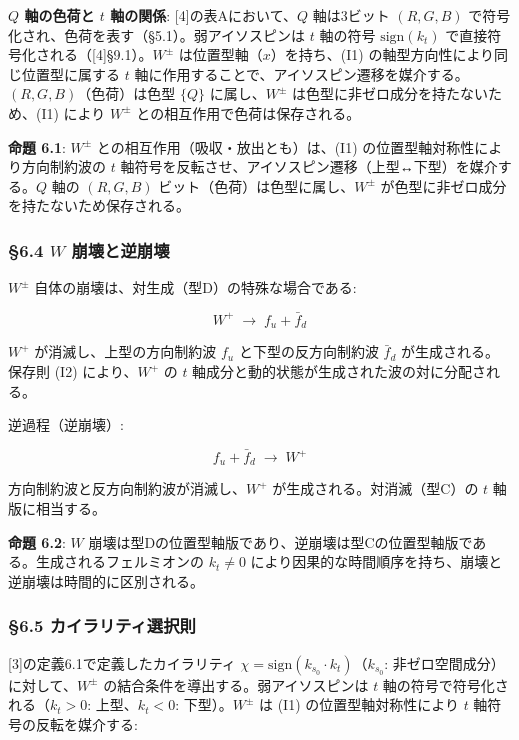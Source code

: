 \documentclass[
  a4paper,11pt]{ltjsarticle}
\theoremstyle{definition}
\theoremstyle{remark}
\begin{document}
\textbf{\(Q\) 軸の色荷と \(t\) 軸の関係}: {[}4{]}の表Aにおいて、\(Q\)
軸は3ビット \((R, G, B)\)
で符号化され、色荷を表す（§5.1）。弱アイソスピンは \(t\) 軸の符号
\(\mathrm{sign}(k_t)\) で直接符号化される（{[}4{]}§9.1）。\(W^{\pm}\)
は位置型軸（\(x\)）を持ち、(I1) の軸型方向性により同じ位置型に属する
\(t\)
軸に作用することで、アイソスピン遷移を媒介する。\((R,G,B)\)（色荷）は色型
\(\{Q\}\) に属し、\(W^{\pm}\) は色型に非ゼロ成分を持たないため、(I1)
により \(W^{\pm}\) との相互作用で色荷は保存される。

\textbf{命題 6.1}: \(W^{\pm}\) との相互作用（吸収・放出とも）は、(I1)
の位置型軸対称性により方向制約波の \(t\)
軸符号を反転させ、アイソスピン遷移（上型↔下型）を媒介する。\(Q\) 軸の
\((R,G,B)\) ビット（色荷）は色型に属し、\(W^{\pm}\)
が色型に非ゼロ成分を持たないため保存される。

\subsubsection{\texorpdfstring{§6.4 \(W\)
崩壊と逆崩壊}{§6.4 W 崩壊と逆崩壊}}\label{w-ux5d29ux58caux3068ux9006ux5d29ux58ca}

\(W^{\pm}\) 自体の崩壊は、対生成（型D）の特殊な場合である:

\[W^+ \;\longrightarrow\; f_u + \bar{f}_d\]

\(W^+\) が消滅し、上型の方向制約波 \(f_u\) と下型の反方向制約波
\(\bar{f}_d\) が生成される。保存則 (I2) により、\(W^+\) の \(t\)
軸成分と動的状態が生成された波の対に分配される。

逆過程（逆崩壊）:

\[f_u + \bar{f}_d \;\longrightarrow\; W^+\]

方向制約波と反方向制約波が消滅し、\(W^+\) が生成される。対消滅（型C）の
\(t\) 軸版に相当する。

\textbf{命題 6.2}: \(W\)
崩壊は型Dの位置型軸版であり、逆崩壊は型Cの位置型軸版である。生成されるフェルミオンの
\(k_t \neq 0\)
により因果的な時間順序を持ち、崩壊と逆崩壊は時間的に区別される。

\subsubsection{§6.5
カイラリティ選択則}\label{ux30abux30a4ux30e9ux30eaux30c6ux30a3ux9078ux629eux5247}

{[}3{]}の定義6.1で定義したカイラリティ
\(\chi = \mathrm{sign}(k_{s_0} \cdot k_t)\)（\(k_{s_0}\):
非ゼロ空間成分）に対して、\(W^{\pm}\)
の結合条件を導出する。弱アイソスピンは \(t\)
軸の符号で符号化される（\(k_t > 0\): 上型、\(k_t < 0\):
下型）。\(W^{\pm}\) は (I1) の位置型軸対称性により \(t\)
軸符号の反転を媒介する:
\end{document}
